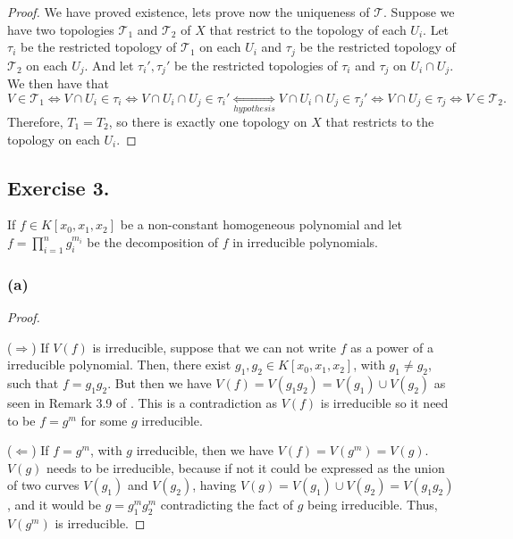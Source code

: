 \documentclass[11pt,a4paper]{article}
\begin{document}
\begin{proof}
  \vspace{1mm}
  We have proved existence, lets prove now the uniqueness of $ \mathcal T $. Suppose we have two topologies $ \mathcal T_1 $ and $ \mathcal T_2 $ of $ X $ that restrict to the topology of each $ U_i $. Let $ \tau_i $ be the restricted topology of $ \mathcal T_1 $ on each $ U_i $ and $ \tau_j $ be the restricted topology of $ \mathcal T_2 $ on each $ U_j $. And let $ \tau_i', \tau_j' $ be the restricted topologies of $ \tau_i $ and $ \tau_j $ on $ U_i \cap U_j $. We then have that 
  $$
    V \in \mathcal T_1 \Leftrightarrow V \cap U_i \in \tau_i \Leftrightarrow V \cap U_i \cap U_j \in \tau_i' \underset{hypothesis}{\Leftrightarrow} V \cap U_i \cap U_j \in \tau_j' \Leftrightarrow  V \cap U_j \in \tau_j \Leftrightarrow V \in \mathcal T_2.
  $$
  Therefore, $ T_1 = T_2 $, so there is exactly one topology on $ X $ that restricts to the topology on each $ U_i $.
\end{proof}
\subsection*{Exercise 3.}

  If $ f \in K[x_0, x_1, x_2] $ be a non-constant homogeneous polynomial and let $ f = \prod_{i=1}^n g_i^{m_i} $ be the decomposition of $ f $ in irreducible polynomials.

\subsubsection*{(a)}
  \begin{proof} \

    \vspace{1mm}
    ($\Rightarrow$)
    If $ V(f) $ is irreducible, suppose that we can not write $ f $ as a power of a irreducible polynomial. Then, there exist $ g_1, g_2 \in K[x_0, x_1, x_2] $, with $ g_1 \neq g_2 $, such that $ f = g_1 g_2 $. But then we have $ V(f) = V(g_1 g_2) = V(g_1) \cup V(g_2) $ as seen in Remark 3.9 of \cite{gath}. This is a contradiction as $ V(f) $ is irreducible so it need to be $ f = g^m $ for some $g$ irreducible.

    \vspace{1mm}
    ($\Leftarrow$)
    If $ f = g^m $, with $ g $ irreducible, then we have $ V(f) = V(g^m) = V(g) $. $ V(g) $ needs to be irreducible, because if not it could be expressed as the union of two curves $ V(g_1) $ and $ V(g_2) $, having $ V(g) = V(g_1) \cup V(g_2) = V(g_1 g_2) $, and it would be $ g =  g_1^m g_2^m $ contradicting the fact of $ g $ being irreducible. Thus, $ V(g^m) $ is irreducible.
  \end{proof}
\end{document}
